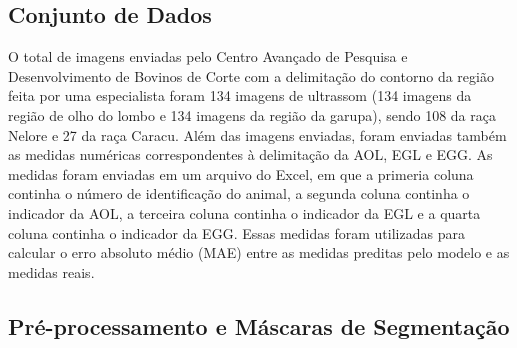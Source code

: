 

\subsection{Conjunto de Dados}

O total de imagens enviadas pelo Centro Avançado de Pesquisa e Desenvolvimento de Bovinos de Corte com a delimitação do contorno da região feita por uma especialista foram 134 imagens de ultrassom (134 imagens da região de olho do lombo e 134 imagens da região da garupa), sendo 108 da raça Nelore e 27 da raça Caracu. Além das imagens enviadas, foram enviadas também as medidas numéricas correspondentes à delimitação da  AOL, EGL e EGG. As medidas foram enviadas em um arquivo do Excel, em que a primeria coluna continha o número de identificação do animal, a segunda coluna continha o indicador da AOL, a terceira coluna continha o indicador da EGL e a quarta coluna continha o indicador da EGG. Essas medidas foram utilizadas para calcular o erro absoluto médio (MAE) entre as medidas preditas pelo modelo e as medidas reais. 

\subsection{Pré-processamento e Máscaras de Segmentação}

